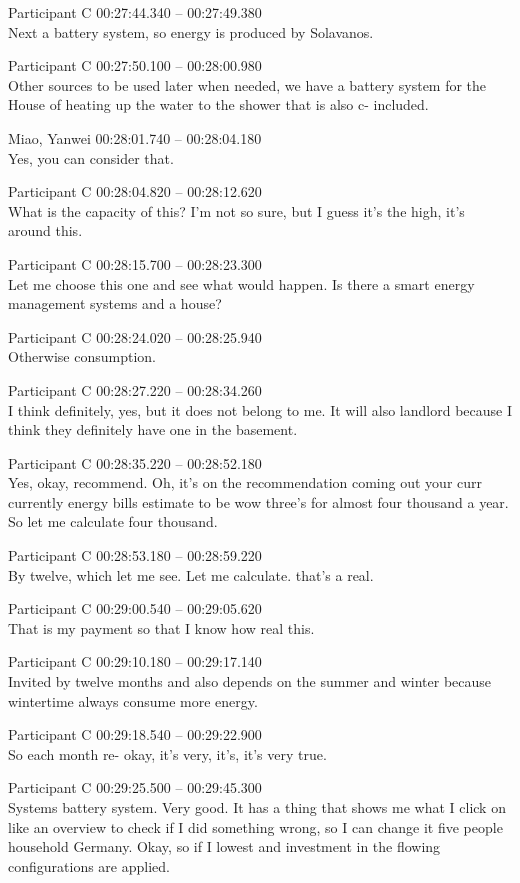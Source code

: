 {Participant C 00:27:44.340 -- 00:27:49.380 \\
Next a battery system, so energy is produced by Solavanos.

Participant C 00:27:50.100 -- 00:28:00.980 \\
Other sources to be used later when needed, we have a battery system for the House of heating up the water to the shower that is also c- included.

Miao, Yanwei 00:28:01.740 -- 00:28:04.180 \\
Yes, you can consider that.

Participant C 00:28:04.820 -- 00:28:12.620 \\
What is the capacity of this? I'm not so sure, but I guess it's the high, it's around this.

Participant C 00:28:15.700 -- 00:28:23.300 \\
Let me choose this one and see what would happen. Is there a smart energy management systems and a house?

Participant C 00:28:24.020 -- 00:28:25.940 \\
Otherwise consumption.

Participant C 00:28:27.220 -- 00:28:34.260 \\
I think definitely, yes, but it does not belong to me. It will also landlord because I think they definitely have one in the basement.

Participant C 00:28:35.220 -- 00:28:52.180 \\
Yes, okay, recommend. Oh, it's on the recommendation coming out your curr currently energy bills estimate to be wow three's for almost four thousand a year. So let me calculate four thousand.

Participant C 00:28:53.180 -- 00:28:59.220 \\
By twelve, which let me see. Let me calculate. that's a real.

Participant C 00:29:00.540 -- 00:29:05.620 \\
That is my payment so that I know how real this.

Participant C 00:29:10.180 -- 00:29:17.140 \\
Invited by twelve months and also depends on the summer and winter because wintertime always consume more energy.

Participant C 00:29:18.540 -- 00:29:22.900 \\
So each month re- okay, it's very, it's, it's very true.

Participant C 00:29:25.500 -- 00:29:45.300 \\
Systems battery system. Very good. It has a thing that shows me what I click on like an overview to check if I did something wrong, so I can change it five people household Germany. Okay, so if I lowest and investment in the flowing configurations are applied.

}
